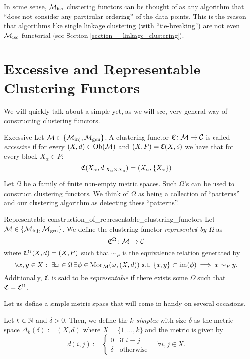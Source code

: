 In some sense, ${\mathcal{M}_\mathrm{iso}}$ clustering functors can be thought of as any algorithm that ``does not consider any particular ordering'' of the data points.
This is the reason that algorithms like single linkage clustering (with ``tie-breaking'') are not even ${\mathcal{M}_\mathrm{iso}}$-functorial (see Section \ref{section__linkage_clustering}).

\section{Excessive and Representable Clustering Functors}

We will quickly talk about a simple yet, as we will see, very general way of constructing clustering functors.

\begin{definition}{Excessive \cite[Def.~6.2]{Carlsson2010}}{}
Let $\mathcal{M} \in \{{\mathcal{M}_\mathrm{inj}}, {\mathcal{M}_\mathrm{gen}}\}$. A clustering functor $\mathfrak{C}\colon \mathcal{M} \to \mathcal{C}$ is called \emph{excessive} if for every $(X,d) \in \mathrm {Ob}(\mathcal{M})$ and $(X,P) = \mathfrak{C}(X,d)$ we have that for every block $X_\alpha \in P$:
$$
\mathfrak{C}(X_\alpha, d|_{X_\alpha \times X_\alpha}) = (X_\alpha, \{X_\alpha\})
$$
\end{definition}

Let $\Omega$ be a family of finite non-empty metric spaces. Such $\Omega$'s can be used to construct clustering functors. We think of $\Omega$ as being a collection of ``patterns'' and our clustering algorithm as detecting these ``patterns''.

\begin{definition}{Representable \cite[Sec.~6.2]{Carlsson2010}}{construction_of_representable_clustering_functors}
Let $\mathcal{M} \in \{{\mathcal{M}_\mathrm{inj}}, {\mathcal{M}_\mathrm{gen}}\}$. We define the clustering functor \emph{represented by $\Omega$} as
$$
\mathfrak{C}^\Omega\colon \mathcal{M} \to \mathcal{C}
$$
where $\mathfrak{C}^\Omega(X,d) = (X, P)$ such that $\sim_P$ 
is the equivalence relation generated by
\begin{equation*}
    \forall x,y \in X: \ \exists \omega \in \Omega \,\exists \phi \in \mathrm {Mor}_{\mathcal{M}}(\omega, (X,d)) \ \text{s.t.} \ \{x,y\} \subset \operatorname*{im}(\phi) \implies x \sim_P y.
\end{equation*}
Additionally, $\mathfrak{C}$ is said to be \emph{representable} if there exists some $\Omega$ such that $\mathfrak{C} = \mathfrak{C}^\Omega$.
\end{definition}

Let us define a simple metric space that will come in handy on several occasions.
\begin{definition}{}{}
    Let $k \in \mathbb N$ and $\delta > 0$. Then, we define the \emph{$k$-simplex} with size $\delta$ as the metric space $\Delta_k(\delta) := (X,d)$ where $X = \{1, \dots, k\}$ and the metric is given by
    $$
    d(i,j) := \begin{cases}
        0 & \text{if } i = j\\
        \delta & \text{otherwise}
    \end{cases} \quad \forall i,j \in X.
    $$
\end{definition}

